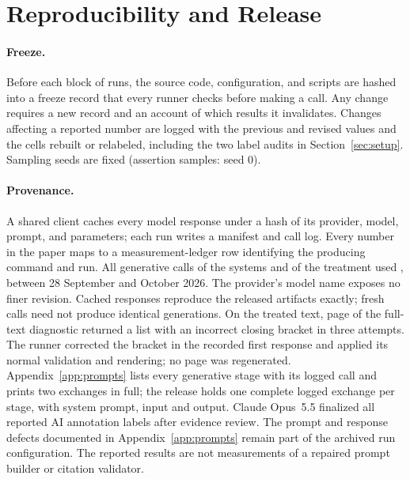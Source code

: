 \section{Reproducibility and Release}
\label{app:reproducibility}

\paragraph{Freeze.} Before each block of runs, the source code, configuration, and scripts
are hashed into a freeze record that every runner checks before making a call. Any change
requires a new record and an account of which results it invalidates. Changes affecting a
reported number are logged with the previous and revised values and the cells rebuilt or
relabeled, including the two label audits in Section~\ref{sec:setup}.
Sampling seeds are fixed (assertion samples: seed 0).

\paragraph{Provenance.} A shared client caches every model response under a hash of its
provider, model, prompt, and parameters; each run writes a manifest and call log. Every number
in the paper maps to a measurement-ledger row identifying the producing command and run.
All generative calls of the systems and of the treatment used , between 28 September and
\fi{} October 2026. The provider's model name exposes no finer revision.
Cached responses reproduce the released artifacts exactly; fresh calls need not produce
identical generations.\ifnwdecon{} On the treated text,  page of the
full-text diagnostic returned a list with an incorrect closing bracket in three attempts.
The runner corrected the bracket in the recorded first response and applied its normal
validation and rendering; no page was regenerated.\fi{} Appendix~\ref{app:prompts} lists
every generative stage with its logged call and prints two exchanges in full; the release
holds one complete logged exchange per stage, with system prompt, input and output. Claude Opus~5.5 finalized all reported AI annotation labels after evidence review.
The prompt and response defects documented in Appendix~\ref{app:prompts} remain part of
the archived run configuration. The reported results are not measurements of a repaired
prompt builder or citation validator.

